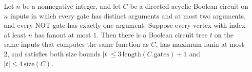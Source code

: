\begin{theorem}
\label{BoolCircuit.DAGCircuit.exists_treeCircuit_of_fanout_le_one}
\leanok
{}
Let $n$ be a nonnegative integer, and let $C$ be a directed acyclic Boolean circuit on
$n$ inputs in which every gate has distinct arguments and at most two arguments, and
every NOT gate has exactly one argument. Suppose every vertex with index at least $n$
has fanout at most $1$. Then there is a Boolean circuit tree $t$ on the same inputs that
computes the same function as $C$, has maximum fanin at most $2$, and satisfies both
size bounds $|t|\leq 3\,\mathrm{length}(C.\mathrm{gates})+1$ and $|t|\leq
4\,\mathrm{size}(C)$.
\end{theorem}
